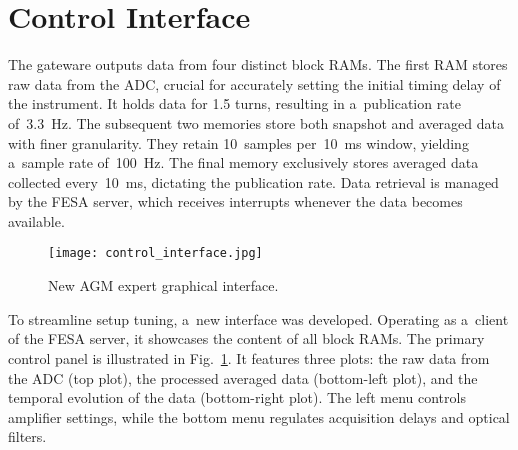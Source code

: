 \section{Control Interface}
The gateware outputs data from four distinct block RAMs. The first RAM stores
raw data from the ADC, crucial for accurately setting the initial timing delay
of the instrument. It holds data for 1.5 turns, resulting in a~publication rate
of~\SI{3.3}{Hz}. The subsequent two memories store both snapshot and averaged
data with finer granularity. They retain 10~samples per~\SI{10}{ms} window,
yielding a~sample rate of~\SI{100}{Hz}. The final memory exclusively stores
averaged data collected every~\SI{10}{ms}, dictating the publication rate. Data
retrieval is managed by the FESA server, which receives interrupts whenever the
data becomes available.
\begin{figure}[!tbh]
    \centering
    \texttt{[image: control\_interface.jpg]}
    \caption{New AGM expert graphical interface.}
    \label{fig:control_interface}
\end{figure}
To streamline setup tuning, a~new interface was developed. Operating as a~client of the FESA server, it showcases the content of all block RAMs. The
primary control panel is illustrated in Fig.~\ref{fig:control_interface}. It
features three plots: the raw data from the ADC (top plot), the processed averaged data
(bottom-left plot), and the temporal evolution of the data (bottom-right plot).
The left menu controls amplifier settings, while the bottom menu regulates
acquisition delays and optical filters.

